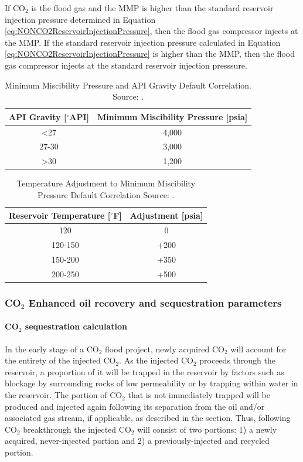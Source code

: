 \documentclass[11pt]{report}
\begin{document}
If CO$_2$ is the flood gas and the MMP is higher than the standard reservoir injection pressure determined in Equation \eqref{eq:NONCO2ReservoirInjectionPressure}, then the flood gas compressor injects at the MMP. If the standard reservoir injection pressure calculated in Equation \eqref{eq:NONCO2ReservoirInjectionPressure} is higher than the MMP, then the flood gas compressor injects at the standard reservoir injection presssure.

\begin{table}
\begin{scriptsize}
\caption{Minimum Miscibility Pressure and API Gravity Default Correlation. Source: \cite{NPC1976}.}
\label{tab:InitialMMPCorrelation}
\begin{tabular}{cc}
\toprule
API Gravity {[}$^{\circ}$API{]} & Minimum Miscibility Pressure {[}psia{]}\tabularnewline
\midrule
<27 & 4,000\tabularnewline
27-30 & 3,000\tabularnewline
>30 & 1,200\tabularnewline
\bottomrule
\end{tabular}
\end{scriptsize}
\end{table}

\begin{table}
\begin{scriptsize}
\caption{Temperature Adjustment to Minimum Miscibility Pressure Default Correlation Source: \cite{NPC1976}.}
\label{tab:MMPCorrelationTempAdjust}
\begin{tabular}{cc}
\toprule
Reservoir Temperature {[}$^{\circ}$F{]} & Adjustment {[}psia{]}\tabularnewline
\midrule
120 & 0\tabularnewline
120-150 & +200\tabularnewline
150-200 & +350\tabularnewline
200-250 & +500\tabularnewline
\bottomrule
\end{tabular}
\end{scriptsize}
\end{table}

\subsubsection{CO$_2$ Enhanced oil recovery and sequestration parameters}\label{sec:Sequestration}

\paragraph{CO$_2$ sequestration calculation} \label{par:IntroSeq}
In the early stage of a CO$_2$ flood project, newly acquired CO$_2$ will account for the entirety of the injected CO$_2$. As the injected CO$_2$ proceeds through the reservoir, a proportion of it will be trapped in the reservoir by factors such as blockage by surrounding rocks of low permeability or by trapping within water in the reservoir. The portion of CO$_2$ that is not immediately trapped will be produced and injected again following its separation from the oil and/or associated gas stream, if applicable, as described in the  section. Thus, following CO$_2$ breakthrough the injected CO$_2$ will consist of two portions: 1) a newly acquired, never-injected portion and 2) a previously-injected and recycled portion. 
\end{document}
